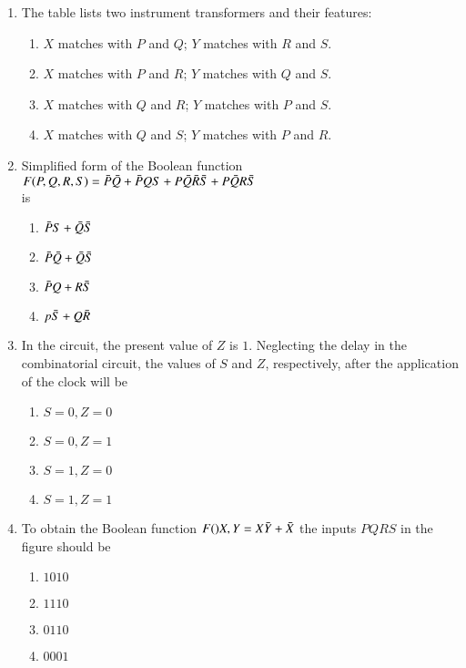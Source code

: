\documentclass[journal,12pt,onecolumn]{IEEEtran}
\theoremstyle{remark}
\begin{document}
\begin{enumerate}
\item The table lists two instrument transformers and their features: 
\begin{table}[h!]
\renewcommand{\thetable}{1}
    \centering
   
\end{table}
\begin{enumerate}
    \item $X$ matches with $P$ and $Q$; $Y$ matches with $R$ and $S$.
    \item $X$ matches with $P$ and $R$; $Y$ matches with $Q$ and $S$.
    \item $X$ matches with $Q$ and $R$; $Y$ matches with $P$ and $S$.
    \item $X$ matches with $Q$ and $S$; $Y$ matches with $P$ and $R$. \\
\end{enumerate}
\item Simplified form of the Boolean function \\ $F(P,Q,R,S)=\Bar{P}\Bar{Q}+\Bar{P}QS+P\Bar{Q}\Bar{R}\Bar{S}+P\Bar{Q}R\Bar{S}$ \\is 
\begin{enumerate}
    \item $\Bar{P}S+\Bar{Q}\Bar{S}$
    \item $\Bar{P}\Bar{Q}+\Bar{Q}\Bar{S}$
    \item $\Bar{P}Q+R\Bar{S}$
    \item $p\Bar{S}+Q\Bar{R}$\\
\end{enumerate}
\item In the circuit, the present value of $Z$ is $1$. Neglecting the delay in the combinatorial 
circuit, the values of $S$ and $Z$, respectively, after the application of the clock will be 

\begin{enumerate}
    \item $S=0,Z=0$
    \item $S=0,Z=1$
    \item $S=1,Z=0$
    \item $S=1,Z=1$
\end{enumerate}
\item To obtain the Boolean function $F()X,Y=X\Bar{Y}+\Bar{X}$ the inputs $PQRS$ in the figure 
should be

\begin{enumerate}
    \item $1010$
    \item $1110$
    \item $0110$
    \item $0001$
\end{enumerate}
























\end{enumerate}
\end{document}
